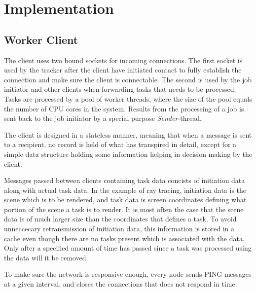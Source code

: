 \chapter{Implementation}

\section{Worker Client}
The client uses two bound sockets for incoming connections. The first socket is
used by the tracker after the client have initiated contact to fully establish
the connection and make sure the client is connectable. The second is used by
the job initiator and other clients when forwarding tasks that needs to be
processed. Tasks are processed by a pool of worker threads, where the size of
the pool equals the number of CPU cores in the system. Results from the
processing of a job is sent back to the job initiator by a special purpose 
\textit{Sender-}thread.

The client is designed in a stateless manner, meaning that when a message is
sent to a recipient, no record is held of what has transpired in detail, except
for a simple data structure holding some information helping in decision making
by the client.

Messages passed between clients containing task data concists of initiation data
along with actual task data. In the example of ray tracing, initiation data is
the scene which is to be rendered, and task data is screen coordinates defining
what portion of the scene a task is to render. It is most often the case that
the scene data is of much larger size than the coordinates that defines a task.
To avoid unneccecary retransmission of initiation data, this information is
stored in a cache even though there are no tasks present which is associated
with the data. Only after a specified amount of time has passed since a task was
processed using the data will it be removed.

To make sure the network is responsive enough, every node sends PING-messages 
at a given interval, and closes the connections that does not respond in time.


